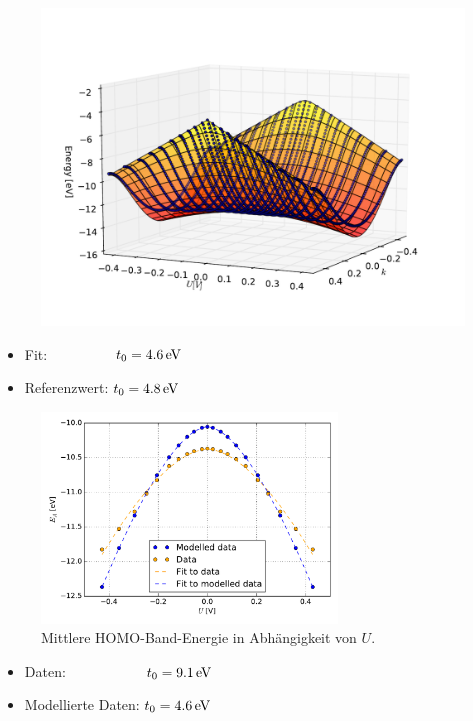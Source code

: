 \begin{frame}
\begin{figure}[]
	\centering
	\includegraphics[width = .8\textwidth]{Images/Hydrogen/charging/3D/figure_1-1}
\end{figure}
\begin{itemize}
\item Fit: $\hspace*{1.6cm} t_0 = \unit[4.6]{eV}$
\item Referenzwert: $t_0 = \unit[4.8]{eV}$
\end{itemize}
\end{frame}

\begin{frame}
\begin{figure}
	\centering
	\includegraphics[width = 0.7\textwidth]{Images/Hydrogen/charging/Homo_energy_charge}
	\caption{Mittlere HOMO-Band-Energie in Abhängigkeit von $U$.}
\end{figure}
\begin{itemize}
\item Daten: $\hspace*{1.9cm} t_0 = \unit[9.1]{eV}$
\item Modellierte Daten: $t_0 = \unit[4.6]{eV}$
\end{itemize}
\end{frame}

